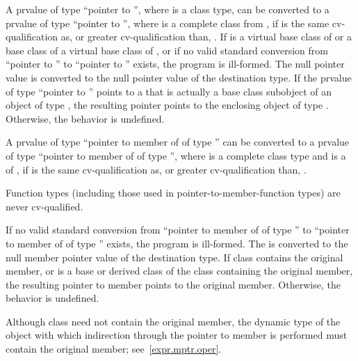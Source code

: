 \pnum
{}%
%
A prvalue of type ``pointer to  '', where 
is a class type, can be converted to a prvalue of type ``pointer to
 '',
where  is a complete class
from ,
if  is the same cv-qualification as,
or greater cv-qualification than, .
If  is a virtual base class of  or
a base class of a virtual base class of , or
if no valid standard conversion from ``pointer to ''
to ``pointer to '' exists, the program is ill-formed.
The null pointer value is converted
to the null pointer value of the destination type. If the prvalue of type
``pointer to  '' points to a  that is
actually a base class subobject of an object of type , the resulting
pointer points to the enclosing object of type . Otherwise, the
behavior is undefined.

\pnum
{}%
A prvalue of type ``pointer to member of  of type 
'' can be converted to a prvalue of type ``pointer to member of
 of type  '', where
 is a complete class type and
 is a  of ,
if  is the same cv-qualification
as, or greater cv-qualification than, .
\begin{note}
Function types (including those used in pointer-to-member-function types)
are never cv-qualified.
\end{note}
If no valid standard conversion
from ``pointer to member of  of type ''
to ``pointer to member of  of type ''
exists, the program is ill-formed.
The  is converted to the null
member pointer value of the destination type. If class 
contains the original member, or is a base or derived class of the class
containing the original member, the resulting pointer to member points
to the original member. Otherwise, the behavior is undefined.
\begin{note}
Although class  need not contain the original member, the
dynamic type of the object with which indirection through the pointer
to member is performed must contain the original member;
see~\ref{expr.mptr.oper}.
\end{note}

